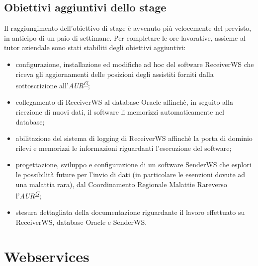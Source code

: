\documentclass[a4paper]{article}
\newcommand{\crmr}{Coordinamento Regionale Malattie Rare}
\begin{document}
\subsection{Obiettivi aggiuntivi dello stage}
Il raggiungimento dell'obiettivo di stage è avvenuto più velocemente del previsto, in anticipo di un paio di settimane. Per completare le ore lavorative, assieme al tutor aziendale sono stati stabiliti degli obiettivi aggiuntivi:
\begin{itemize}
	\item configurazione, installazione ed modifiche ad hoc del software ReceiverWS che riceva gli aggiornamenti delle posizioni degli assistiti forniti dalla sottoscrizione all'\textit{AUR\textsuperscript{\hyperref[sec:gl]{G}}};
    \item collegamento di ReceiverWS al database Oracle affinchè, in seguito alla ricezione di nuovi dati, il software li memorizzi automaticamente nel database;
    \item abilitazione del sistema di logging di ReceiverWS affinchè la porta di dominio rilevi e memorizzi le informazioni riguardanti l'esecuzione del software;
    \item progettazione, sviluppo e configurazione di un software SenderWS che esplori le possibilità future per l'invio di dati (in particolare le esenzioni dovute ad una malattia rara), dal \crmr verso l'\textit{AUR\textsuperscript{\hyperref[sec:gl]{G}}};
    \item stesura dettagliata della documentazione riguardante il lavoro effettuato su ReceiverWS, database Oracle e SenderWS.
\end{itemize}

\newpage

\section{Webservices}
\end{document}
